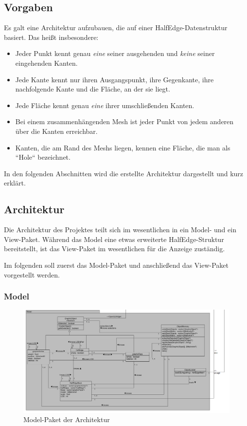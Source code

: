 \subsection{Vorgaben}
Es galt eine Architektur aufzubauen, die auf einer HalfEdge-Datenstruktur basiert. Das heißt insbesondere:
\begin{itemize}
\item Jeder Punkt kennt genau \textit{eine} seiner ausgehenden und \textit{keine} seiner eingehenden Kanten.
\item Jede Kante kennt nur ihren Ausgangspunkt, ihre Gegenkante, ihre nachfolgende Kante und die Fläche, an der sie liegt.
\item Jede Fläche kennt genau \textit{eine} ihrer umschließenden Kanten. 
\item Bei einem zusammenhängenden Mesh ist jeder Punkt von jedem anderen über die Kanten erreichbar.
\item Kanten, die am Rand des Meshs liegen, kennen eine Fläche, die man als ``Hole`` bezeichnet.
\end{itemize}
In den folgenden Abschnitten wird die erstellte Architektur dargestellt und kurz erklärt.

\subsection{Architektur}
Die Architektur des Projektes teilt sich im wesentlichen in ein Model- und ein View-Paket. 
Während das Model eine etwas erweiterte HalfEdge-Struktur bereitstellt, ist das View-Paket im wesentlichen für die Anzeige zuständig. 

Im folgenden soll zuerst das Model-Paket und anschlie\ss{}end das View-Paket vorgestellt werden.

\subsubsection{Model}
\begin{figure}[htbp]
\centering
\includegraphics[angle=90,scale=0.5]{content/pictures/architekturModel.png}
\caption{Model-Paket der Architektur}
\label{fig:model}
\end{figure}

